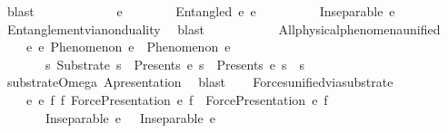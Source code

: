\begin{isabellebody}
\ blast\isanewline
\ \ \ \ \isamarkupfalse%
\isanewline
\ \ \ \ \ \ \isamarkupfalse%
\ e{}\isanewline
\ \ \ \ \ \ \isamarkupfalse%
\ {\isachardoublequoteopen}Entangled\ e\ e{}{\isachardoublequoteclose}\isanewline
\ \ \ \ \ \ \isamarkupfalse%
\ \isamarkupfalse%
\ {\isachardoublequoteopen}Inseparable\ e{}\ {\isasymOmega}{\isachardoublequoteclose}\ \isamarkupfalse%
\ Entanglement{\isacharunderscore}{\kern0pt}via{\isacharunderscore}{\kern0pt}nonduality\ \isamarkupfalse%
\ blast\isanewline
\ \ \ \ \isamarkupfalse%
\isanewline
\ \ \isamarkupfalse%
%
\endisatagproof
{\isafoldproof}%
%
\isadelimproof
\isanewline
%
\endisadelimproof
\isanewline
\ \ \isamarkupfalse%
\ All{\isacharunderscore}{\kern0pt}physical{\isacharunderscore}{\kern0pt}phenomena{\isacharunderscore}{\kern0pt}unified{\isacharcolon}{\kern0pt}\isanewline
\ \ \ \ {\isachardoublequoteopen}{\isasymforall}e{}\ e{}{\isachardot}{\kern0pt}\ Phenomenon\ e{}\ {\isasymand}\ Phenomenon\ e{}\ {\isasymlongrightarrow}\isanewline
\ \ \ \ \ \ \ {\isacharparenleft}{\kern0pt}{\isasymexists}s{\isachardot}{\kern0pt}\ Substrate\ s\ {\isasymand}\ Presents\ e{}\ s\ {\isasymand}\ Presents\ e{}\ s\ {\isasymand}\ s\ {\isacharequal}{\kern0pt}\ {\isasymOmega}{\isacharparenright}{\kern0pt}{\isachardoublequoteclose}\isanewline
%
\isadelimproof
\ \ \ \ %
\endisadelimproof
%
\isatagproof
{}\isamarkupfalse%
\ substrate{\isacharunderscore}{\kern0pt}Omega\ A{}{\isacharunderscore}{\kern0pt}presentation\ \isamarkupfalse%
\ blast%
\endisatagproof
{\isafoldproof}%
%
\isadelimproof
\isanewline
%
\endisadelimproof
\isanewline
\ \ \isamarkupfalse%
\ Forces{\isacharunderscore}{\kern0pt}unified{\isacharunderscore}{\kern0pt}via{\isacharunderscore}{\kern0pt}substrate{\isacharcolon}{\kern0pt}\isanewline
\ \ \ \ {\isachardoublequoteopen}{\isasymforall}e{}\ e{}\ f{}\ f{}{\isachardot}{\kern0pt}\ ForcePresentation\ e{}\ f{}\ {\isasymand}\ ForcePresentation\ e{}\ f{}\ {\isasymlongrightarrow}\isanewline
\ \ \ \ \ \ \ Inseparable\ e{}\ {\isasymOmega}\ {\isasymand}\ Inseparable\ e{}\ {\isasymOmega}{\isachardoublequoteclose}\isanewline
%
\isadelimproof

\end{isabellebody}
